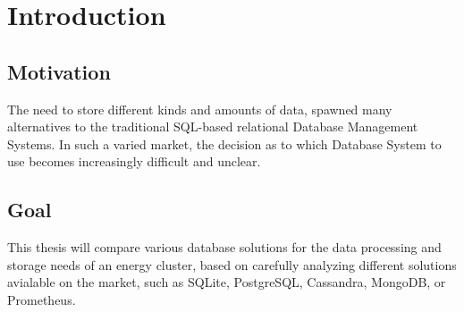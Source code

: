 \chapter{Introduction}
\label{ch:intro}

%
%
\section{Motivation}
\label{sec:intro:motivation}
The need to store different kinds and amounts of data, spawned many alternatives to the traditional SQL-based relational Database Management Systems. In such a varied market, the decision as to which Database System to use becomes increasingly difficult and unclear. 
%
%
\section{Goal}
\label{sec:intro:goal}
This thesis will compare various database solutions for the data processing and storage needs of an energy cluster, based on carefully analyzing different solutions avialable on the market, such as SQLite, PostgreSQL, Cassandra, MongoDB, or Prometheus.

%
%

